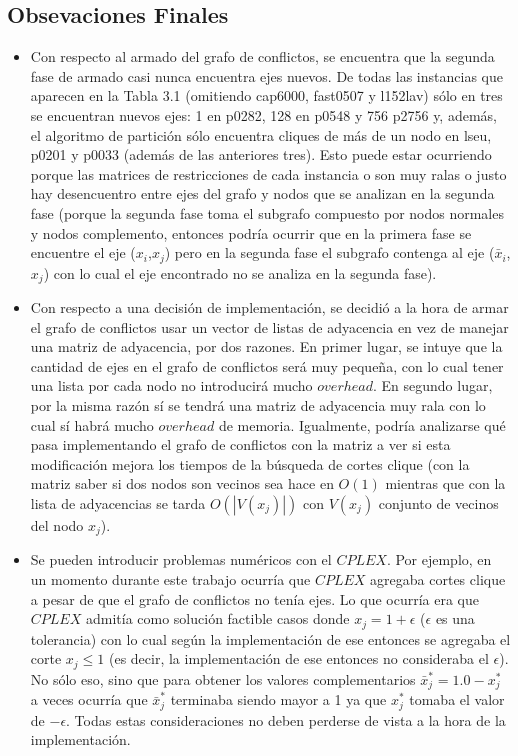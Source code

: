 \subsection{Obsevaciones Finales}

\begin{itemize}

\item Con respecto al armado del grafo de conflictos, se encuentra que la segunda fase de armado casi nunca encuentra ejes nuevos. De todas las instancias que aparecen en la Tabla 3.1 (omitiendo cap6000, fast0507 y l152lav) sólo en tres se encuentran nuevos ejes: 1 en p0282, 128 en p0548 y 756 p2756 y, además, el algoritmo de partición sólo encuentra cliques de más de un nodo en lseu, p0201 y p0033 (además de las anteriores tres). Esto puede estar ocurriendo porque las matrices de restricciones de cada instancia o son muy ralas o justo hay desencuentro entre ejes del grafo y nodos que se analizan en la segunda fase (porque la segunda fase toma el subgrafo compuesto por nodos normales y nodos complemento, entonces podría ocurrir que en la primera fase se encuentre el eje ($x_i$,$x_j$) pero en la segunda fase el subgrafo contenga al eje ($\bar{x}_i$,$x_j$) con lo cual el eje encontrado no se analiza en la segunda fase). 


\item Con respecto a una decisión de implementación, se decidió a la hora de armar el grafo de conflictos usar un vector de listas de adyacencia en vez de manejar una matriz de adyacencia, por dos razones. En primer lugar, se intuye que la cantidad de ejes en el grafo de conflictos será muy pequeña, con lo cual tener una lista por cada nodo no introducirá mucho $overhead$. En segundo lugar, por la misma razón sí se tendrá una matriz de adyacencia muy rala con lo cual sí habrá mucho $overhead$ de memoria. Igualmente, podría analizarse qué pasa implementando el grafo de conflictos con la matriz a ver si esta modificación mejora los tiempos de la búsqueda de cortes clique (con la matriz saber si dos nodos son vecinos sea hace en $O(1)$ mientras que con la lista de adyacencias se tarda $O(|V(x_j)|)$ con $V(x_j)$ conjunto de vecinos del nodo $x_j$).


\item Se pueden introducir problemas numéricos con el $CPLEX$. Por ejemplo, en un momento durante este trabajo ocurría que $CPLEX$ agregaba cortes clique a pesar de que el grafo de conflictos no tenía ejes. Lo que ocurría era que $CPLEX$ admitía como solución factible casos donde $x_j = 1 + \epsilon$ ($\epsilon$ es una tolerancia) con lo cual según la implementación de ese entonces se agregaba el corte $x_j \leq 1$ (es decir, la implementación de ese entonces no consideraba el $\epsilon$). No sólo eso, sino que para obtener los valores complementarios $\bar{x}^*_j = 1.0 - x^*_j$ a veces ocurría que $\bar{x}^*_j$ terminaba siendo mayor a 1 ya que $x^*_j$ tomaba el valor de $-\epsilon$. Todas estas consideraciones no deben perderse de vista a la hora de la implementación.



\end{itemize}
